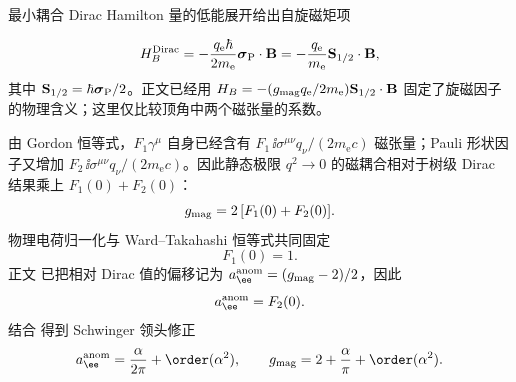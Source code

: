\begin{derivation}
最小耦合 Dirac Hamilton 量的低能展开给出自旋磁矩项

\begin{equation*}
 H_{B}^{\rm Dirac}
 =-\frac{q_{\mathrm e}\hbar}{2m_{\mathrm e}}\boldsymbol\sigma_{\rm P}\cdot\mathbf B
 =-\frac{q_{\mathrm e}}{m_{\mathrm e}}\mathbf S_{1/2}\cdot\mathbf B,
\end{equation*}
其中 $\mathbf S_{1/2}=\hbar\boldsymbol\sigma_{\rm P}/2$。正文已经用
$H_B=-(g_{\rm mag}q_{\mathrm e}/2m_{\mathrm e})\mathbf S_{1/2}\cdot\mathbf B$ 固定了旋磁因子的物理含义；这里仅比较顶角中两个磁张量的系数。

由 Gordon 恒等式，$F_1\gamma^\mu$ 自身已经含有
$F_1\,\ii\sigma^{\mu\nu}q_\nu/(2m_{\mathrm e} c)$ 磁张量；Pauli 形状因子又增加
$F_2\,\ii\sigma^{\mu\nu}q_\nu/(2m_{\mathrm e} c)$。因此静态极限 $q^2\to0$ 的磁耦合相对于树级 Dirac 结果乘上
$F_1(0)+F_2(0)$：
\begin{equation*}
 {
 g_{\rm mag}=2\,[F_1(0)+F_2(0)].}
 \end{equation*}
物理电荷归一化与 Ward--Takahashi 恒等式共同固定
\begin{equation*}
 F_1(0)=1.
\end{equation*}
正文 已把相对 Dirac 值的偏移记为 $a_\ee^{\rm anom}=(g_{\rm mag}-2)/2$，因此
\begin{equation*}
 a_\ee^{\rm anom}=F_2(0).
\end{equation*}
结合  得到 Schwinger 领头修正
\begin{equation*}
 {
 a_\ee^{\rm anom}
 =\frac{\alpha}{2\pi}+\order(\alpha^2),
 \qquad
 g_{\rm mag}
 =2+\frac{\alpha}{\pi}+\order(\alpha^2).}
 \end{equation*}
\end{derivation}

